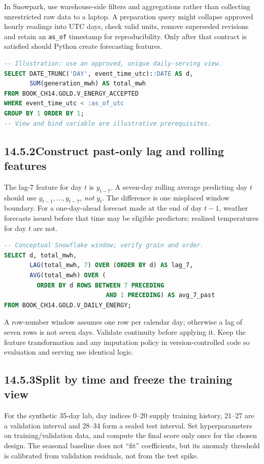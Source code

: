 \documentclass[11pt,twoside]{article}
\newcommand{\topic}[2]{\subsection*{#1\quad #2}}
\begin{document}
In Snowpark, use warehouse-side filters and aggregations rather than collecting unrestricted raw data to a laptop. A preparation query might collapse approved hourly readings into UTC days, check valid units, remove superseded revisions and retain an \texttt{as\_of} timestamp for reproducibility. Only after that contract is satisfied should Python create forecasting features.
\begin{lstlisting}[language=SQL]
-- Illustration: use an approved, unique daily-serving view.
SELECT DATE_TRUNC('DAY', event_time_utc)::DATE AS d,
       SUM(generation_mwh) AS total_mwh
FROM BOOK_CH14.GOLD.V_ENERGY_ACCEPTED
WHERE event_time_utc < :as_of_utc
GROUP BY 1 ORDER BY 1;
-- View and bind variable are illustrative prerequisites.
\end{lstlisting}
\topic{14.5.2}{Construct past-only lag and rolling features}
The lag-7 feature for day $t$ is $y_{t-7}$. A seven-day rolling average predicting day $t$ should use $y_{t-1},\ldots,y_{t-7}$, \emph{not} $y_t$. The difference is one misplaced window boundary. For a one-day-ahead forecast made at the end of day $t-1$, weather forecasts issued before that time may be eligible predictors; realized temperatures for day $t$ are not.
\begin{lstlisting}[language=SQL]
-- Conceptual Snowflake window; verify grain and order.
SELECT d, total_mwh,
       LAG(total_mwh, 7) OVER (ORDER BY d) AS lag_7,
       AVG(total_mwh) OVER (
         ORDER BY d ROWS BETWEEN 7 PRECEDING
                            AND 1 PRECEDING) AS avg_7_past
FROM BOOK_CH14.GOLD.V_DAILY_ENERGY;
\end{lstlisting}
A row-number window assumes one row per calendar day; otherwise a lag of seven rows is not seven days. Validate continuity before applying it. Keep the feature transformation and any imputation policy in version-controlled code so evaluation and serving use identical logic.

\newpage

\topic{14.5.3}{Split by time and freeze the training view}
For the synthetic 35-day lab, day indices 0--20 supply training history, 21--27 are a validation interval and 28--34 form a sealed test interval. Set hyperparameters on training/validation data, and compute the final score only once for the chosen design. The seasonal baseline does not ``fit'' coefficients, but its anomaly threshold is calibrated from validation residuals, not from the test spike.
\end{document}
